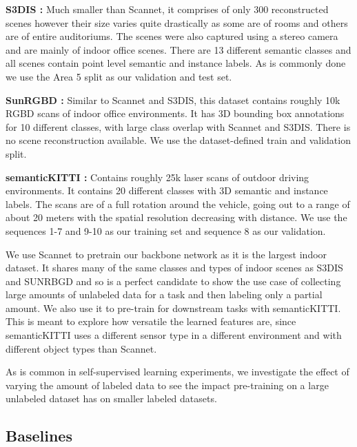 \documentclass[10pt,twocolumn,letterpaper]{article}
\begin{document}
\textbf{S3DIS \cite{armeni20163D}:} Much smaller than Scannet, it comprises of only 300 reconstructed scenes however their size varies quite drastically as some are of rooms and others are of entire auditoriums. The scenes were also captured using a stereo camera and are mainly of indoor office scenes. There are 13 different semantic classes and all scenes contain point level semantic and instance labels. As is commonly done \cite{xie2020pointcontrast, hou2021Exploring} we use the Area 5 split as our validation and test set.

\textbf{SunRGBD \cite{song2015sunrgbd, janoch2011category, xiao2013database, silberman2012indoor}:} Similar to Scannet and S3DIS, this dataset contains roughly 10k RGBD scans of indoor office environments. It has 3D bounding box annotations for 10 different classes, with large class overlap with Scannet and S3DIS. There is no scene reconstruction available. We use the dataset-defined train and validation split.

\textbf{semanticKITTI \cite{behley2019semantic, geiger2012are}: } Contains roughly 25k laser scans of outdoor driving environments. It contains 20 different classes with 3D semantic and instance labels. The scans are of a full rotation around the vehicle, going out to a range of about 20 meters with the spatial resolution decreasing with distance. We use the sequences 1-7 and 9-10 as our training set and sequence 8 as our validation.

We use Scannet to pretrain our backbone network as it is the largest indoor dataset. It shares many of the same classes and types of indoor scenes as S3DIS and SUNRBGD and so is a perfect candidate to show the use case of collecting large amounts of unlabeled data for a task and then labeling only a partial amount. We also use it to pre-train for downstream tasks with semanticKITTI. This is meant to explore how versatile the learned features are, since semanticKITTI uses a different sensor type in a different environment and with different object types than Scannet.

As is common in self-supervised learning experiments, we investigate the effect of varying the amount of labeled data to see the impact pre-training on a large unlabeled dataset has on smaller labeled datasets.

\subsection{Baselines}
\label{sec:results:baselines}
\end{document}

